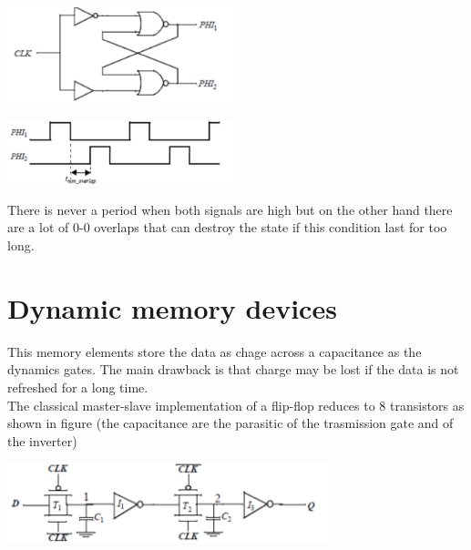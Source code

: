 \centering
\includegraphics[width=0.5\textwidth]{C10_13.png}\\
\raggedright

\centering
\includegraphics[width=0.5\textwidth]{C10_14.png}\\
\raggedright

There is never a period when both signals are high but on the other hand there are a lot of 0-0 overlaps that can destroy the state if this condition last for too long.\\

\section{Dynamic memory devices}
This memory elements store the data as chage across a capacitance as the dynamics gates. The main drawback is that charge may be lost if the data is not refreshed for a long time.\\
The classical master-slave implementation of a flip-flop reduces to 8 transistors as shown in figure (the capacitance are the parasitic of the trasmission gate and of the inverter)

\vspace{2mm}
\centering
\includegraphics[width=0.7\textwidth]{C10_15.png}\\
\raggedright
\vspace{2mm}

